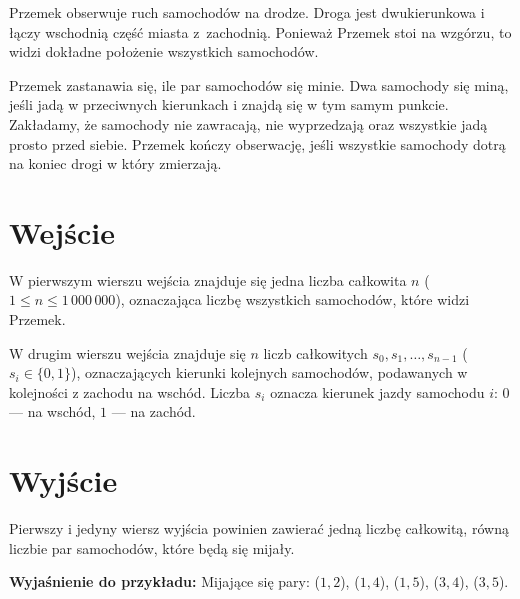 \documentclass{spiral-kurs}
\begin{document}
\makeheader
%
    Przemek obserwuje ruch samochodów na drodze. Droga jest dwukierunkowa i łączy
    wschodnią część miasta z~zachodnią. Ponieważ Przemek stoi na wzgórzu,
    to widzi dokładne położenie wszystkich samochodów.

    Przemek zastanawia się, ile par samochodów się minie.
    Dwa samochody się miną, jeśli jadą w przeciwnych kierunkach i znajdą się w tym samym punkcie.
    Zakładamy, że samochody nie zawracają, nie wyprzedzają oraz wszystkie jadą prosto przed siebie.
    Przemek kończy obserwację, jeśli wszystkie samochody dotrą na koniec drogi w który zmierzają.

    \section{Wejście}
    W pierwszym wierszu wejścia znajduje się jedna liczba całkowita $n$ ($1 \leq n \leq 1\,000\,000$),
    oznaczająca liczbę wszystkich samochodów, które widzi Przemek.

    W drugim wierszu wejścia znajduje się $n$ liczb całkowitych $s_0, s_1, \ldots, s_{n-1}$ ($s_i \in \{0, 1\}$),
    oznaczających kierunki kolejnych samochodów, podawanych w kolejności z zachodu na wschód.
    Liczba $s_i$ oznacza kierunek jazdy samochodu $i$: $0$ --- na wschód, $1$ --- na zachód.

    \section{Wyjście}
    Pierwszy i jedyny wiersz wyjścia powinien zawierać jedną liczbę całkowitą,
    równą liczbie par samochodów, które będą się mijały.


    \medskip
    \noindent
    \textbf{Wyjaśnienie do przykładu:} Mijające się pary: ($1, 2$), ($1, 4$), ($1, 5$), ($3, 4$), ($3, 5$).

  
\end{document}
